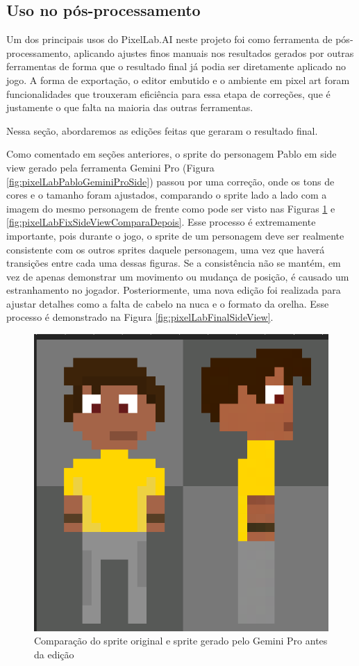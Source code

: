\FloatBarrier
\subsection{Uso no pós-processamento}
\label{s.pixelLab.edicao}


Um dos principais usos do PixelLab.AI neste projeto foi como ferramenta de pós-processamento, aplicando ajustes finos manuais nos resultados gerados por outras ferramentas de forma que o resultado final já podia ser diretamente aplicado no jogo. A forma de exportação, o editor embutido e o ambiente em pixel art foram funcionalidades que trouxeram eficiência para essa etapa de correções, que é justamente o que falta na maioria das outras ferramentas.

Nessa seção, abordaremos as edições feitas que geraram o resultado final.

Como comentado em seções anteriores, o sprite do personagem Pablo em side view gerado pela ferramenta Gemini Pro (Figura \ref{fig:pixelLabPabloGeminiProSide}) passou por uma correção, onde os tons de cores e o tamanho foram ajustados, comparando o sprite lado a lado com a imagem do mesmo personagem de frente como pode ser visto nas Figuras \ref{fig:pixelLabFixSideViewComparaAntes} e \ref{fig:pixelLabFixSideViewComparaDepois}. Esse processo é extremamente importante, pois durante o jogo, o sprite de um personagem deve ser realmente consistente com os outros sprites daquele personagem, uma vez que haverá transições entre cada uma dessas figuras. Se a consistência não se mantém, em vez de apenas demonstrar um movimento ou mudança de posição, é causado um estranhamento no jogador. Posteriormente, uma nova edição foi realizada para ajustar detalhes como a falta de cabelo na nuca e o formato da orelha. Esse processo é demonstrado na Figura \ref{fig:pixelLabFinalSideView}.

\begin{figure}[htbp]
    \centering
    \caption{\small Comparação do sprite original e sprite gerado pelo Gemini Pro antes da edição}
    \label{fig:pixelLabFixSideViewComparaAntes}
    \includegraphics[width=0.4\linewidth]{figs/pixelLab/dia3/comparacao.PNG}
\end{figure}
    
